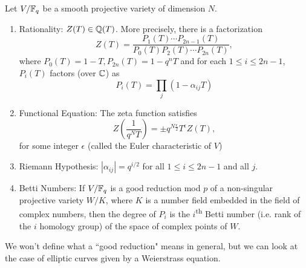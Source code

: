 \begin{theorem}
	\label{thm:weil}
	Let $V/\mathbb{F}_q$ be a smooth projective variety of dimension $N$.
	\begin{enumerate}[label=(\alph*)]
		\item Rationality: $Z(T) \in \mathbb{Q}(T)$. More precisely, 
			there is a factorization
			\begin{equation*}
				Z(T) = \frac{P_1(T)\cdots P_{2n-1}(T)}
				{P_0(T)P_2(T) \cdots P_{2n}(T)},
			\end{equation*}
			where $P_0(T) = 1 - T, P_{2n}(T) = 1 - q^nT$ and for each
			$1 \leq i \leq 2n - 1$, $P_i(T)$ factors (over $\mathbb{C}$) as
			\begin{equation*}
				P_i(T) = \prod_j (1 - \alpha_{ij}T)
			\end{equation*}
		\item Functional Equation: The zeta function satisfies
			\begin{equation*}
				Z\left(\frac{1}{q^NT}\right) = \pm q^{N\frac{\epsilon}{2}}
				T^{\epsilon} Z(T),
			\end{equation*}
			for some integer $\epsilon$ (called the Euler characteristic of $V$)
		\item Riemann Hypothesis: $|\alpha_{ij}| = q^{i/2}$
			for all $1 \leq i \leq 2n - 1$ and all $j$.
		\item Betti Numbers: If $V/\mathbb{F}_q$ is a good reduction mod $p$ of a
			non-singular projective variety $W/K$, where $K$ is a number
			field embedded in the field of complex numbers, then the degree
			of $P_i$ is the $i$\textsuperscript{th} Betti number (i.e.
			rank of the $i$ homology group) of the space
			of complex points of $W$. 
	\end{enumerate}
\end{theorem}

We won't define what a ``good reduction" means in general, but we can
look at the case of elliptic curves given by a Weierstrass equation.

